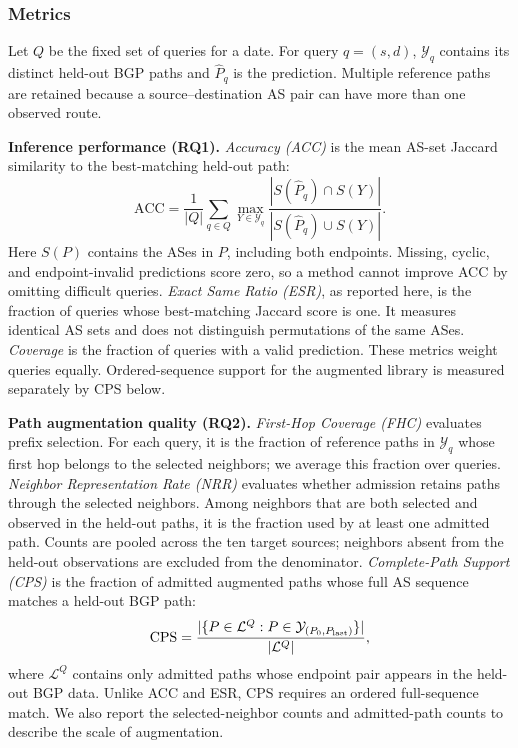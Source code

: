 \subsubsection{Metrics}
\label{sec:metrics}

Let $Q$ be the fixed set of queries for a date. For query $q=(s,d)$,
$\mathcal Y_q$ contains its distinct held-out BGP paths and
$\widehat P_q$ is the prediction. Multiple reference paths are retained
because a source--destination AS pair can have more than one observed
route.

\textbf{Inference performance (RQ1).}
\emph{Accuracy (ACC)} is the mean AS-set Jaccard similarity to the
best-matching held-out path:
\begin{equation}
\mathrm{ACC}=\frac{1}{|Q|}\sum_{q\in Q}
       \max_{Y\in\mathcal Y_q}
       \frac{|S(\widehat P_q)\cap S(Y)|}
            {|S(\widehat P_q)\cup S(Y)|}.
\label{eq:jaccard}
\end{equation}
Here $S(P)$ contains the ASes in $P$, including both endpoints.
Missing, cyclic, and endpoint-invalid predictions score zero, so a
method cannot improve ACC by omitting difficult queries.
\emph{Exact Same Ratio (ESR)}, as reported here, is the fraction of
queries whose best-matching Jaccard score is one. It measures identical
AS sets and does not distinguish permutations of the same ASes.
\emph{Coverage} is the fraction of queries with a valid prediction.
These metrics weight queries equally. Ordered-sequence support for
the augmented library is measured separately by CPS below.

\textbf{Path augmentation quality (RQ2).}
\emph{First-Hop Coverage (FHC)} evaluates prefix selection. For each
query, it is the fraction of reference paths in $\mathcal Y_q$ whose
first hop belongs to the selected neighbors; we average this fraction
over queries. \emph{Neighbor Representation Rate (NRR)} evaluates
whether admission retains paths through the selected neighbors. Among
neighbors that are both selected and observed in the held-out paths,
it is the fraction used by at least one admitted path. Counts are
pooled across the ten target sources; neighbors absent from the
held-out observations are excluded from the denominator.
\emph{Complete-Path Support (CPS)} is the fraction of admitted
augmented paths whose full AS sequence matches a held-out BGP path:
\begin{equation}
\mathrm{CPS}=\frac{|\{P\in\mathcal L^Q:P\in
             \mathcal Y_{(P_0,P_{\rm last})}\}|}
        {|\mathcal L^Q|},
\label{eq:library_support}
\end{equation}
where $\mathcal L^Q$ contains only admitted paths whose endpoint pair
appears in the held-out BGP data. Unlike ACC and ESR, CPS requires an
ordered full-sequence match. We also report the selected-neighbor
counts and admitted-path counts to describe the scale of augmentation.

